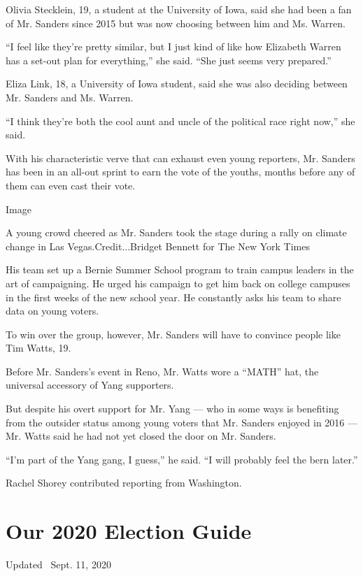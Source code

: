 Olivia Stecklein, 19, a student at the University of Iowa, said she had
been a fan of Mr. Sanders since 2015 but was now choosing between him
and Ms. Warren.

``I feel like they're pretty similar, but I just kind of like how
Elizabeth Warren has a set-out plan for everything,'' she said. ``She
just seems very prepared.''

Eliza Link, 18, a University of Iowa student, said she was also deciding
between Mr. Sanders and Ms. Warren.

``I think they're both the cool aunt and uncle of the political race
right now,'' she said.

With his characteristic verve that can exhaust even young reporters, Mr.
Sanders has been in an all-out sprint to earn the vote of the youths,
months before any of them can even cast their vote.

Image

A young crowd cheered as Mr. Sanders took the stage during a rally on
climate change in Las Vegas.Credit...Bridget Bennett for The New York
Times

His team set up a Bernie Summer School program to train campus leaders
in the art of campaigning. He urged his campaign to get him back on
college campuses in the first weeks of the new school year. He
constantly asks his team to share data on young voters.

To win over the group, however, Mr. Sanders will have to convince people
like Tim Watts, 19.

Before Mr. Sanders's event in Reno, Mr. Watts wore a ``MATH'' hat, the
universal accessory of Yang supporters.

But despite his overt support for Mr. Yang --- who in some ways is
benefiting from the outsider status among young voters that Mr. Sanders
enjoyed in 2016 --- Mr. Watts said he had not yet closed the door on Mr.
Sanders.

``I'm part of the Yang gang, I guess,'' he said. ``I will probably feel
the bern later.''

Rachel Shorey contributed reporting from Washington.

\hypertarget{our-2020-election-guide}{%
\section{Our 2020 Election Guide}\label{our-2020-election-guide}}

Updated ~Sept. 11, 2020

